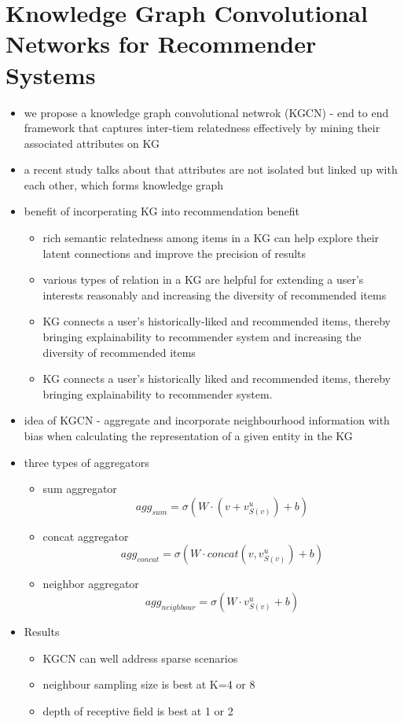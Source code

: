\documentclass{report}
\begin{document}
\section{Knowledge Graph Convolutional Networks for Recommender Systems}
\begin{itemize}
    \item we propose a knowledge graph convolutional netwrok (KGCN) - end to end framework that captures inter-tiem relatedness effectively by mining their associated attributes on KG 
    \item a recent study talks about that attributes are not isolated but linked up with each other, which forms knowledge graph
    \item benefit of incorperating KG into recommendation benefit
    \begin{itemize}
        \item rich semantic relatedness among items in a KG can help explore their latent connections and improve the precision of results
        \item various types of relation in a KG are helpful for extending a user's interests reasonably and increasing the diversity of recommended items
        \item KG connects a user's historically-liked and recommended items, thereby bringing explainability to recommender system and increasing the diversity of recommended items
        \item KG connects a user's historically liked and recommended items, thereby bringing explainability to recommender system.
    \end{itemize}
    \item idea of KGCN - aggregate and incorporate neighbourhood information with bias when calculating the representation of a given entity in the KG
    \item three types of aggregators
    \begin{itemize}
        \item sum aggregator $$ agg_{sum} = \sigma (W \cdot (v+v^u_{S(v)})+b)$$
        \item concat aggregator   $$ agg_{concat} = \sigma (W \cdot concat(v,v^u_{S(v)})+b)$$
        \item neighbor aggregator  $$ agg_{neighbour} = \sigma (W \cdot v^u_{S(v)}+b)$$
    \end{itemize}
    \item Results 
    \begin{itemize}
        \item KGCN can well address sparse scenarios
        \item neighbour sampling size is best at K=4 or 8
        \item depth of receptive field is best at 1 or 2
    \end{itemize}
\end{itemize}
\end{document}
